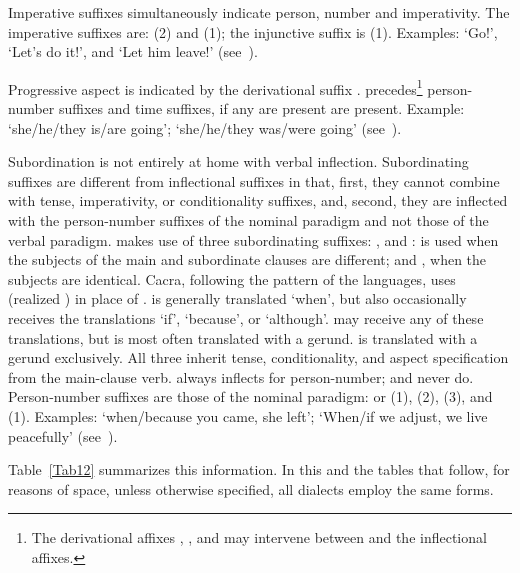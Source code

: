 Imperative suffixes simultaneously indicate person, number and imperativity. The imperative suffixes are:  (2) and  (1); the injunctive suffix is  (1). Examples:  ‘Go!’,  ‘Let’s do it!’, and  ‘Let him leave!’ (see~).

Progressive aspect is indicated by the derivational suffix .  precedes\footnote{The derivational affixes , , and  may intervene between  and the inflectional affixes.} person-number suffixes and time suffixes, if any are present are present. Example:  ‘she/he/they is/are going’;  ‘she/he/they was/were going’ (see~).

Subordination is not entirely at home with verbal inflection. Subordinating suffixes are different from inflectional suffixes in that, first, they cannot combine with tense, imperativity, or conditionality suffixes, and, second, they are inflected with the person-number suffixes of the nominal paradigm and not those of the verbal paradigm. \SYQ{} makes use of three subordinating suffixes: ,  and :  is used when the subjects of the main and subordinate clauses are different;  and , when the subjects are identical. Cacra, following the pattern of the \QI{} languages, uses  (realized \textipa{[l]}) in place of .  is generally translated ‘when’, but also occasionally receives the translations ‘if’, ‘because’, or ‘although’.  may receive any of these translations, but is most often translated with a gerund.  is translated with a gerund exclusively. All three inherit tense, conditionality, and aspect specification from the main-clause verb.  always inflects for person-number;  and  never do. Person-number suffixes are those of the nominal paradigm:  or \phono{-:} (1),  (2),  (3), and  (1). Examples:  ‘when/because you came, she left’;  ‘When/if we adjust, we live peacefully’ (see~).

Table~\ref{Tab12} summarizes this information. In this and the tables that follow, for reasons of space, unless otherwise specified, all dialects employ the same forms.


